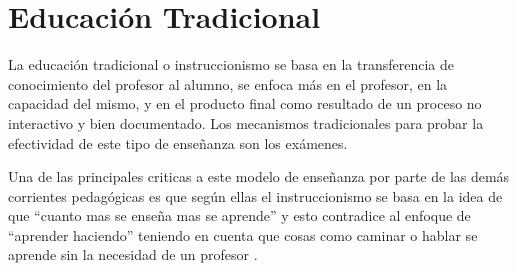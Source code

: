 \section{Educación Tradicional}

La educación tradicional o instruccionismo se basa en la transferencia de 
conocimiento del profesor al alumno, se enfoca más en el profesor, en la 
capacidad del mismo, y en el producto final como resultado de un proceso 
no interactivo y bien documentado\cite{igi:instructionism}. Los mecanismos 
tradicionales para probar la efectividad de este tipo de enseñanza son los exámenes.




Una de las principales criticas a este modelo de enseñanza por parte de las
demás corrientes pedagógicas es que según ellas el instruccionismo se basa en la
idea de que  \enquote{cuanto mas se enseña mas se aprende} y esto contradice al
enfoque de \enquote{aprender haciendo} teniendo en cuenta que cosas como caminar
o hablar se aprende sin la necesidad de un profesor
\cite{ackoff:education,johnson2005instructionism}. 




